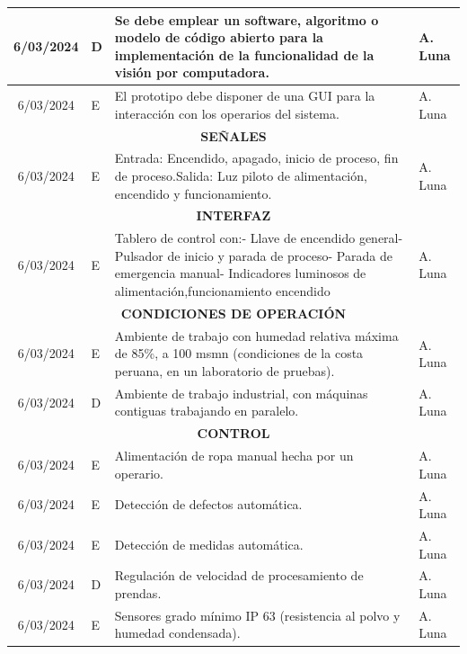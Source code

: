 \begin{longtable}{|c|p{4.5em}|p{22.5em}|p{6em}|}
	\hline
	6/03/2024 & D     & Se debe emplear un software, algoritmo o modelo de código abierto para la implementación de la funcionalidad de la visión por computadora. & A. Luna \bigstrut\\
	\hline
	6/03/2024 & E     & El prototipo debe disponer de una GUI para la interacción con los operarios del sistema.  & A. Luna \bigstrut\\
	\hline
	\multicolumn{4}{|p{37.5em}|}{\textbf{SEÑALES}} \bigstrut\\
	\hline
	6/03/2024 & E     & Entrada: Encendido, apagado, inicio de proceso, fin de proceso.\newline{}Salida: Luz piloto de alimentación, encendido y funcionamiento. & A. Luna \bigstrut\\
	\hline
	\multicolumn{4}{|p{37.5em}|}{\textbf{INTERFAZ}} \bigstrut\\
	\hline
	6/03/2024 & E     & Tablero de control con:\newline{}- Llave de encendido general\newline{}- Pulsador de inicio y parada de proceso\newline{}- Parada de emergencia manual\newline{}- Indicadores luminosos de alimentación,funcionamiento encendido & A. Luna \bigstrut\\
	\hline
	\multicolumn{4}{|p{37.5em}|}{\textbf{CONDICIONES DE OPERACIÓN}} \bigstrut\\
	\hline
	6/03/2024 & E     & Ambiente de trabajo con humedad relativa máxima de 85\%, a 100 msmn (condiciones de la costa peruana, en un laboratorio de pruebas). & A. Luna \bigstrut\\
	\hline
	6/03/2024 & D     & Ambiente de trabajo industrial, con máquinas contiguas trabajando en paralelo. & A. Luna \bigstrut\\
	\hline
	\multicolumn{4}{|p{37.5em}|}{\textbf{CONTROL}} \bigstrut\\
	\hline
	6/03/2024 & E     & Alimentación de ropa manual hecha por un operario. & A. Luna \bigstrut\\
	\hline
	6/03/2024 & E     & Detección de defectos automática. & A. Luna \bigstrut\\
	\hline
	6/03/2024 & E     & Detección de medidas automática. & A. Luna \bigstrut\\
	\hline
	6/03/2024 & D     & Regulación de velocidad de procesamiento de prendas. & A. Luna \bigstrut\\
	\hline
	6/03/2024 & E     & Sensores grado mínimo IP 63 (resistencia al polvo y humedad condensada). & A. Luna \bigstrut\\

\end{longtable}
